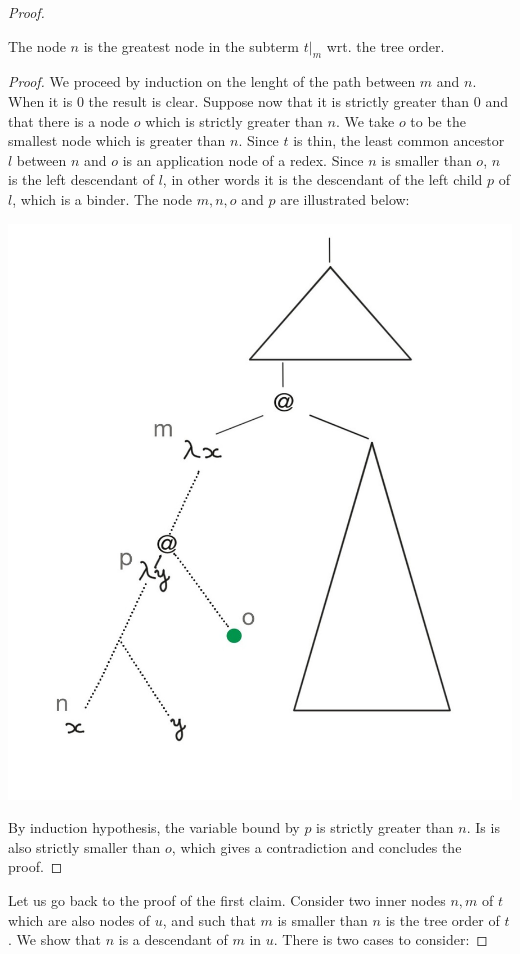 \begin{proof}
\begin{lemma}
The node $n$ is the greatest node in the subterm $t|_m$ wrt. the tree order. 
\end{lemma}
\begin{proof}
We proceed by induction on the lenght of the path between $m$ and $n$. When it is $0$ the result is clear. Suppose now that it is strictly greater than $0$ and that there is a node $o$ which is strictly greater than $n$. We take $o$ to be the smallest node which is greater than $n$. Since $t$ is thin, the least common ancestor $l$ between $n$ and $o$ is an application node of a redex. Since $n$ is smaller than $o$, $n$ is the left descendant  of $l$, in other words it is the descendant of the left child $p$
of $l$, which is a binder. The node $m, n, o$ and $p$ are illustrated below:
\begin{center}
		\includegraphics[scale=.15]{MyPic11.jpg}
\end{center} 
 By induction hypothesis, the variable
bound by $p$ is strictly greater than $n$. Is is also strictly smaller than $o$, which gives a contradiction and concludes the proof. 
\end{proof}

Let us go back to the proof of the first claim. Consider two inner nodes $n, m$ of $t$ which are also nodes of $u$, and such that $m$ is smaller than $n$ is the tree order of $t$. We show that $n$ is a descendant of $m$ in $u$. There is two cases to consider:


\end{proof}
